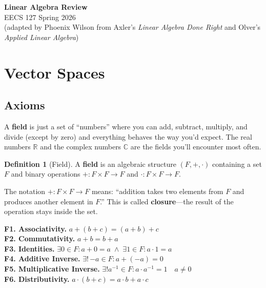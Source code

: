 \documentclass[11pt]{article}
\theoremstyle{definition}
\newtheorem{definition}{Definition}[section]
\theoremstyle{plain}
\theoremstyle{remark}
\begin{document}
\begin{center}
  {\Huge \textbf{Linear Algebra Review}} \\[12pt]
  {\Large EECS 127 Spring 2026} \\[24pt]
  {\normalsize (adapted by Phoenix Wilson from Axler's \textit{Linear Algebra Done Right} and Olver's \textit{Applied Linear Algebra})}
\end{center}

\vspace{12pt}

\tableofcontents
\newpage

\section{Vector Spaces}

\subsection{Axioms}

\begin{intuitionbox}
A \textbf{field} is just a set of ``numbers'' where you can add, subtract, multiply, and divide (except by zero) and everything behaves the way you'd expect. The real numbers $\mathbb{R}$ and the complex numbers $\mathbb{C}$ are the fields you'll encounter most often.
\end{intuitionbox}

\begin{definition}[Field]
A \textbf{field} is an algebraic structure $(F, +, \cdot)$ containing a set $F$ and binary operations $+ : F \times F \to F$ and $\cdot : F \times F \to F$.
\end{definition}

The notation $+: F \times F \to F$ means: ``addition takes two elements from $F$ and produces another element in $F$.'' This is called \textbf{closure}---the result of the operation stays inside the set.

\begin{axiombox}
\textbf{F1. Associativity.} $a + (b + c) = (a + b) + c$ \\[4pt]
\textbf{F2. Commutativity.} $a + b = b + a$ \\[4pt]
\textbf{F3. Identities.} $\exists 0 \in F : a + 0 = a \;\wedge\; \exists 1 \in F : a \cdot 1 = a$ \\[4pt]
\textbf{F4. Additive Inverse.} $\exists!\, {-a} \in F : a + (-a) = 0$ \\[4pt]
\textbf{F5. Multiplicative Inverse.} $\exists! a^{-1} \in F : a \cdot a^{-1} = 1 \quad a \neq 0$ \\[4pt]
\textbf{F6. Distributivity.} $a \cdot (b + c) = a \cdot b + a \cdot c$
\end{axiombox}
\end{document}
